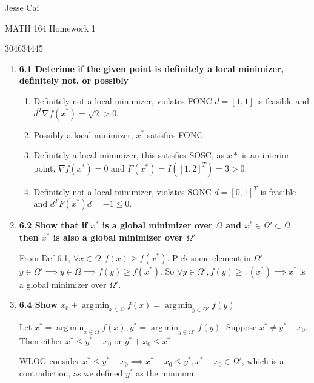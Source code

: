 \documentclass[10pt,a4paper]{article}
\DeclareMathOperator*{\argmin}{arg\,min}
\begin{document}
Jesse Cai

MATH 164 Homework 1

304634445

\begin{enumerate}
    \item \textbf{6.1 Deterime if the given point is definitely a local minimizer, definitely not, or possibly}
    \begin{enumerate}
        \item Definitely not a local minimizer, violates FONC $d = [1, 1]$ is feasible and $d^T\nabla f(x^*) = \sqrt{2} > 0$.
        \item Possibly a local minimizer, $x^*$ satisfies FONC.
        \item Definitely a local minimizer, this satisfies SOSC, as $x*$ is an interior point, $\nabla f(x^*) = 0$ and $F(x^*) = I([1, 2]^T)  = 3 > 0$.
        \item Definitely not a local minimizer, violates SONC $d = [0, 1]^T$ is feasible and $d^TF(x^*)d = -1 \leq 0$.
    \end{enumerate}

    \item \textbf{6.2 Show that if $x^*$ is a global minimizer over $\Omega$ and $x^* \in \Omega' \subset \Omega$ then $x^*$ is also a global minimizer over $\Omega'$}

        From Def 6.1, $\forall x \in \Omega, f(x) \geq f(x^*)$. Pick some element in $\Omega'$. $y \in \Omega' \implies y \in \Omega \implies f(y) \geq f(x^*)$.
        So $\forall y \in \Omega', f(y) \geq :(x^*) \implies x^*$ is a global minimizer over $\Omega'$.

    \item \textbf{6.4 Show $x_0 + \argmin_{x \in \Omega} f(x) = \argmin_{y \in \Omega'} f(y)$ }

        Let $x^* = \argmin_{x \in \Omega} f(x), y^* = \argmin_{y \in \Omega'} f(y)$.
        Suppose $x^* \neq y^* + x_0$. Then either $x^* \leq  y^* + x_0$ or $y^* + x_0 \leq x^*$.

        WLOG consider $x^* \leq  y^* + x_0 \implies x^* - x_0 \leq y^*, x^* - x_0\in \Omega'$, which is a contradiction, as we defined $y^*$ as the mininum. 


\end{enumerate}
\end{document}

